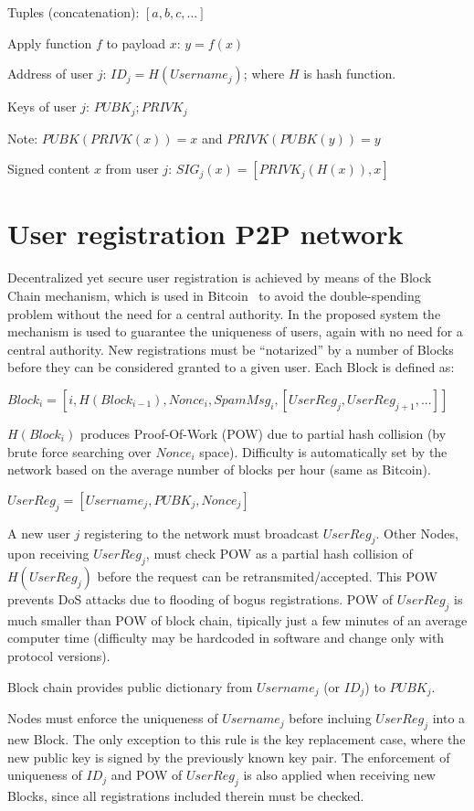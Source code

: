 \documentclass[a4paper,10pt]{article}
\begin{document}
Tuples (concatenation): $ [a,b,c,...] $

Apply function $f$ to payload $x$: $ y = f(x) $

Address of user $j$: $ ID_j = H(Username_j) $; where $H$ is hash function.

Keys of user $j$: $ PUBK_j; PRIVK_j $

Note: $PUBK(PRIVK(x)) = x$ and $PRIVK(PUBK(y)) = y$

Signed content $x$ from user $j$: $SIG_j(x) = \left[ PRIVK_j( H(x) ), x \right]$

\section{User registration P2P network}

Decentralized yet secure user registration is achieved by means of the Block Chain mechanism, which is used in Bitcoin~\cite{nakamoto2008bitcoin} to avoid the double-spending problem without the need for a central authority. In the proposed system the mechanism is used to guarantee the uniqueness of users, again with no need for a central authority. New registrations must be ``notarized'' by a number of Blocks before they can be considered granted to a given user. Each Block is defined as:

$Block_i = \left[ i, H(Block_{i-1}), Nonce_i, SpamMsg_i, \left[UserReg_j, UserReg_{j+1}, ...\right] \right]$

$H(Block_i)$ produces Proof-Of-Work (POW) due to partial hash collision (by brute force searching over $Nonce_i$ space). Difficulty is automatically set by the network based on the average number of blocks per hour (same as Bitcoin).

$UserReg_j = [Username_j, PUBK_j, Nonce_j]$

A new user $j$ registering to the network must broadcast $UserReg_j$. Other Nodes, upon receiving $UserReg_j$, must check POW as a partial hash collision of $H( UserReg_j )$ before the request can be retransmited/accepted. This POW prevents DoS attacks due to flooding of bogus registrations. POW of $UserReg_j$ is much smaller than POW of block chain, tipically just a few minutes of an average computer time (difficulty may be hardcoded in software and change only with protocol versions).

Block chain provides public dictionary from $Username_j$ (or $ID_j$) to $PUBK_j$.

Nodes must enforce the uniqueness of $Username_j$ before incluing $UserReg_j$ into a new Block. The only exception to this rule is the key replacement case, where the new public key is signed by the previously known key pair. The enforcement of uniqueness of $ID_j$ and POW of $UserReg_j$ is also applied when receiving new Blocks, since all registrations included therein must be checked.
\end{document}
